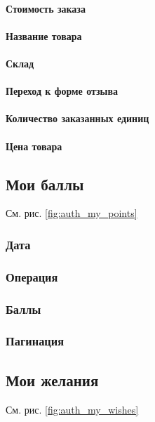                 \paragraph{Стоимость заказа}
                \paragraph{Название товара}
                \paragraph{Склад}
                \paragraph{Переход к форме отзыва}
                \paragraph{Количество заказанных единиц}
                \paragraph{Цена товара}
            
        \subsection{Мои баллы}

            См. рис. \ref{fig:auth_my_points}
        
            \subsubsection{Дата}
            \subsubsection{Операция}
            \subsubsection{Баллы}
            \subsubsection{Пагинация}
            
        \subsection{Мои желания}
            \label{sec:auth_my_wishes}
            См. рис. \ref{fig:auth_my_wishes}
        
        
        